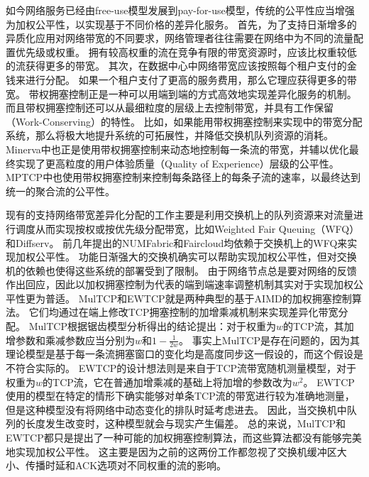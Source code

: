 \documentclass[winfonts]{njuthesis}
\begin{document}
如今网络服务已经由free-use模型发展到pay-for-use模型，传统的公平性应当增强为加权公平性，以实现基于不同价格的差异化服务。
首先，为了支持日渐增多的异质化应用对网络带宽的不同要求，网络管理者往往需要在网络中为不同的流量配置优先级或权重\cite{Hong2013SWAN}。
拥有较高权重的流在竞争有限的带宽资源时，应该比权重较低的流获得更多的带宽。
其次，在数据中心中网络带宽应该按照每个租户支付的金钱来进行分配\cite{popa2012faircloud}。
如果一个租户支付了更高的服务费用，那么它理应获得更多的带宽。
带权拥塞控制正是一种可以用端到端的方式高效地实现差异化服务的机制。
而且带权拥塞控制还可以从最细粒度的层级上去控制带宽，并具有工作保留（Work-Conserving）的特性。
比如，如果能用带权拥塞控制来实现\cite{popa2012faircloud}中的带宽分配系统，那么将极大地提升系统的可拓展性，并降低交换机队列资源的消耗。
Minerva\cite{Nathan2019wcubic}中也正是使用带权拥塞控制来动态地控制每一条流的带宽，并辅以优化最终实现了更高粒度的用户体验质量（Quality of Experience）层级的公平性。
MPTCP\cite{wischik2011design}中也使用带权拥塞控制来控制每条路径上的每条子流的速率，以最终达到统一的聚合流的公平性。

现有的支持网络带宽差异化分配的工作主要是利用交换机上的队列资源来对流量进行调度从而实现按权或按优先级分配带宽，比如Weighted Fair Queuing（WFQ）\cite{demers1989analysis}\cite{Abhay1993WFQ}和Diffserv\cite{Kathleen1998Diffserv}。
前几年提出的NUMFabric\cite{nagaraj2016numfabric}和Faircloud\cite{popa2012faircloud}均依赖于交换机上的WFQ来实现加权公平性。
功能日渐强大的交换机确实可以帮助实现加权公平性，但对交换机的依赖也使得这些系统的部署受到了限制。
由于网络节点总是要对网络的反馈作出回应，因此以加权拥塞控制为代表的端到端速率调整机制其实对于实现加权公平性更为普适。
MulTCP\cite{crowcroft1998differentiated}和EWTCP\cite{wischik2011design}就是两种典型的基于AIMD的加权拥塞控制算法。
它们均通过在端上修改TCP拥塞控制的加增乘减机制来实现差异化带宽分配。
MulTCP根据锯齿模型分析得出的结论\cite{Floyd1997Sawtooth}提出：对于权重为$w$的TCP流，其加增参数和乘减参数应当分别为$w$和$1-\frac{1}{2w}$。
事实上MulTCP是存在问题的，因为其理论模型是基于每一条流拥塞窗口的变化均是高度同步这一假设的，而这个假设是不符合实际的。
EWTCP的设计想法则是来自于TCP流带宽随机测量模型\cite{padhye1998modeling}，对于权重为$w$的TCP流，它在普通加增乘减的基础上将加增的参数改为$w^2$。
EWTCP使用的模型在特定的情形下确实能够对单条TCP流的带宽进行较为准确地测量，但是这种模型没有将网络中动态变化的排队时延考虑进去。
因此，当交换机中队列的长度发生改变时，这种模型就会与现实产生偏差。
总的来说，MulTCP和EWTCP都只是提出了一种可能的加权拥塞控制算法，而这些算法都没有能够完美地实现加权公平性。
这主要是因为之前的这两份工作\cite{crowcroft1998differentiated}\cite{wischik2011design}都忽视了交换机缓冲区大小、传播时延和ACK选项对不同权重的流的影响。
\end{document}
